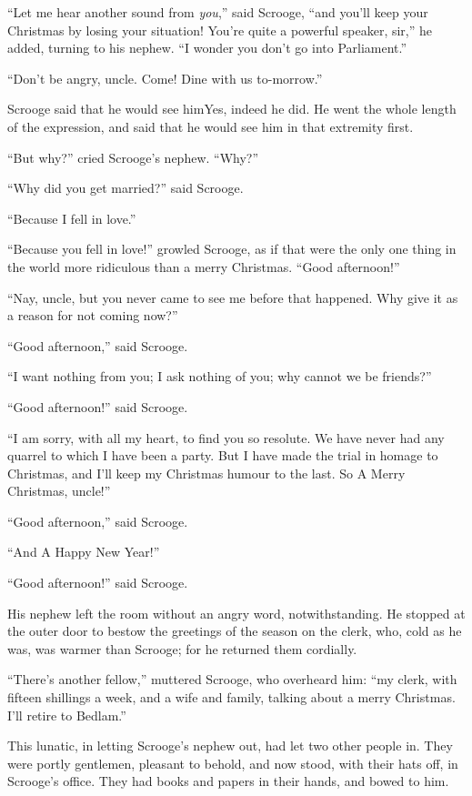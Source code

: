 \documentclass[paper=5.5in:8.5in,BCOR=7mm,twoside,DIV=calc,12pt,usegeometry]{scrbook} %
\begin{document}
\enquote{Let me hear another sound from \textit{you},} said Scrooge, \enquote{and you'll keep your Christmas by losing your situation! You're quite a powerful speaker, sir,} he added, turning to his nephew. \enquote{I wonder you don't go into Parliament.}

\enquote{Don't be angry, uncle. Come! Dine with us to-morrow.}

Scrooge said that he would see him\textemdash \textemdash Yes, indeed he did. He went the whole length of the expression, and said that he would see him in that extremity first.

\enquote{But why?} cried Scrooge's nephew. \enquote{Why?}

\enquote{Why did you get married?} said Scrooge.

\enquote{Because I fell in love.}

\enquote{Because you fell in love!} growled Scrooge, as if that were the only one thing in the world more ridiculous than a merry Christmas. \enquote{Good afternoon!}

\enquote{Nay, uncle, but you never came to see me before that happened. Why give it as a reason for not coming now?}

\enquote{Good afternoon,} said Scrooge.

\enquote{I want nothing from you; I ask nothing of you; why cannot we be friends?}

\enquote{Good afternoon!} said Scrooge.

\enquote{I am sorry, with all my heart, to find you so resolute. We have never had any quarrel to which I have been a party. But I have made the trial in homage to Christmas, and I'll keep my Christmas humour to the last. So A Merry Christmas, uncle!}

\enquote{Good afternoon,} said Scrooge.

\enquote{And A Happy New Year!}

\enquote{Good afternoon!} said Scrooge.

His nephew left the room without an angry word, notwithstanding. He stopped at the outer door to bestow the greetings of the season on the clerk, who, cold as he was, was warmer than Scrooge; for he returned them cordially.

\enquote{There's another fellow,} muttered Scrooge, who overheard him: \enquote{my clerk, with fifteen shillings a week, and a wife and family, talking about a merry Christmas. I'll retire to Bedlam.}

This lunatic, in letting Scrooge's nephew out, had let two other people in. They were portly gentlemen, pleasant to behold, and now stood, with their hats off, in Scrooge's office. They had books and papers in their hands, and bowed to him.
\end{document}
